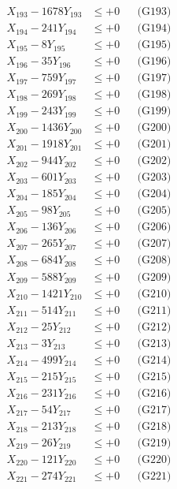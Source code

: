 \documentclass[a4paper,10pt]{article}
\begin{document}
{\begin{align}
X_{193} - 1678Y_{193} &\leq +0 && \text{(G193)} \\
X_{194} - 241Y_{194} &\leq +0 && \text{(G194)} \\
X_{195} - 8Y_{195} &\leq +0 && \text{(G195)} \\
X_{196} - 35Y_{196} &\leq +0 && \text{(G196)} \\
X_{197} - 759Y_{197} &\leq +0 && \text{(G197)} \\
X_{198} - 269Y_{198} &\leq +0 && \text{(G198)} \\
X_{199} - 243Y_{199} &\leq +0 && \text{(G199)} \\
X_{200} - 1436Y_{200} &\leq +0 && \text{(G200)} \\
\allowbreak
X_{201} - 1918Y_{201} &\leq +0 && \text{(G201)} \\
X_{202} - 944Y_{202} &\leq +0 && \text{(G202)} \\
X_{203} - 601Y_{203} &\leq +0 && \text{(G203)} \\
X_{204} - 185Y_{204} &\leq +0 && \text{(G204)} \\
X_{205} - 98Y_{205} &\leq +0 && \text{(G205)} \\
X_{206} - 136Y_{206} &\leq +0 && \text{(G206)} \\
X_{207} - 265Y_{207} &\leq +0 && \text{(G207)} \\
X_{208} - 684Y_{208} &\leq +0 && \text{(G208)} \\
X_{209} - 588Y_{209} &\leq +0 && \text{(G209)} \\
X_{210} - 1421Y_{210} &\leq +0 && \text{(G210)} \\
\allowbreak
X_{211} - 514Y_{211} &\leq +0 && \text{(G211)} \\
X_{212} - 25Y_{212} &\leq +0 && \text{(G212)} \\
X_{213} - 3Y_{213} &\leq +0 && \text{(G213)} \\
X_{214} - 499Y_{214} &\leq +0 && \text{(G214)} \\
X_{215} - 215Y_{215} &\leq +0 && \text{(G215)} \\
X_{216} - 231Y_{216} &\leq +0 && \text{(G216)} \\
X_{217} - 54Y_{217} &\leq +0 && \text{(G217)} \\
X_{218} - 213Y_{218} &\leq +0 && \text{(G218)} \\
X_{219} - 26Y_{219} &\leq +0 && \text{(G219)} \\
X_{220} - 121Y_{220} &\leq +0 && \text{(G220)} \\
\allowbreak
X_{221} - 274Y_{221} &\leq +0 && \text{(G221)} \\

\end{align}}
\end{document}
